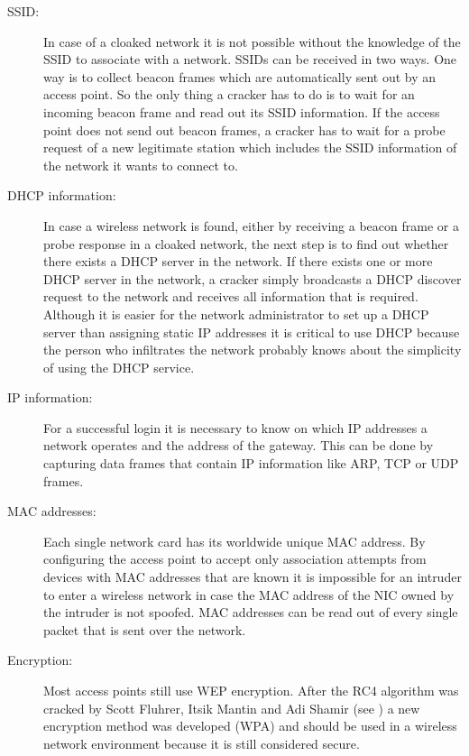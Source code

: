 \begin{description}
    \item[SSID:]
		In case of a cloaked network it is not possible without the
		knowledge of the SSID to associate with a network. SSIDs can be received
		in two ways. One way is to collect beacon frames which are automatically sent out by an access point. So the only thing a cracker has to do is to wait for an incoming beacon frame and read out its SSID information. If the access point does not send out beacon frames, a cracker has to
		wait for a probe request of a new legitimate station which includes the SSID information of the network it wants to connect to.
	\item[DHCP information:]
		In case a wireless network is found, either by receiving a beacon frame
		or a probe response in a cloaked network, the next step is to find
		out whether there exists a DHCP server in the network. If there exists
		one or more DHCP server in the network, a cracker simply broadcasts a
		DHCP discover request to the network and receives all information that is
		required. Although it is easier for the network administrator to
		set up a DHCP server than assigning static \ac{IP} addresses it is critical
		to use DHCP because the person who infiltrates the network
		probably knows about the simplicity of using the DHCP service.
	\item[IP information:]
		For a successful login it is necessary to know on which IP addresses a 
		network operates and the address of the gateway. This can be done by 
		capturing data frames that contain IP information like ARP, TCP or UDP 
		frames.
	\item[MAC addresses:]
		Each single network card has its worldwide unique MAC address. By 
		configuring the access point to accept only association attempts from devices with MAC 
		addresses that are known it is impossible for an 
		intruder to enter a wireless network in case the MAC address of the 
		\ac{NIC} owned by the intruder is not spoofed. MAC addresses can be read 
		out of every single packet that is sent over the network.
	\item[Encryption:]
		Most access points still use WEP encryption. After the 
		RC4 algorithm was cracked by Scott Fluhrer, Itsik 
		Mantin and Adi Shamir (see \cite{rc4weak}) a new encryption method was developed (WPA) and should be used 
		in a wireless network environment because it is still considered secure. %

\end{description}
